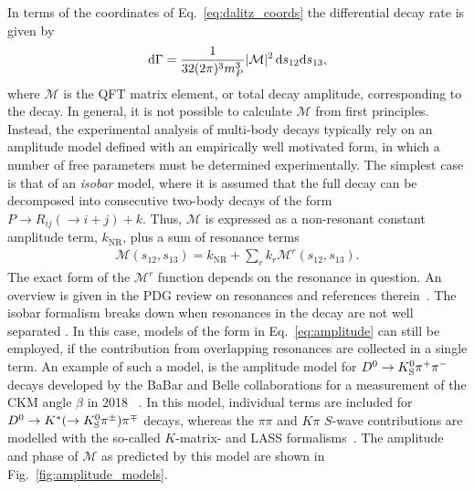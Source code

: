 In terms of the coordinates of Eq.~\eqref{eq:dalitz_coords} the differential decay rate is given by
\begin{align}
    \text d \Gamma = \frac{1}{32(2\pi)^3 m^3_P} |\mathcal M|^2 \,\text d s_{12} \text d s_{13},
\end{align}
where $\mathcal M$ is the QFT matrix element, or total decay amplitude, corresponding to the decay. In general, it is not possible to calculate $\mathcal M$ from first principles. Instead, the experimental analysis of multi-body decays typically rely on an amplitude model defined with an empirically well motivated form, in which a number of free parameters must be determined experimentally. The simplest case is that of an \emph{isobar} model, where it is assumed that the full decay can be decomposed into consecutive two-body decays of the form $P \to R_{ij} (\to i + j) + k$. Thus, $\mathcal M$ is expressed as a non-resonant constant amplitude term, $k_\mathrm{NR}$, plus a sum of resonance terms
\begin{align}\label{eq:amplitude}
    \mathcal M (s_{12}, s_{13}) = k_{\mathrm {NR}} + \sum_r k_r \mathcal M^r(s_{12}, s_{13}).
\end{align}
The exact form of the $\mathcal M^r$ function depends on the resonance in question. An overview is given in the PDG review on resonances and references therein~\cite{PDG2020}. The isobar formalism breaks down when resonances in the decay are not well separated . In this case, models of the form in Eq.~\eqref{eq:amplitude} can still be employed, if the contribution from overlapping resonances are collected in a single term. An example of such a model, is the amplitude model for ${{D}^0}\rightarrow{\ensuremath{{K}^0_{\mathrm{S}}}}{\ensuremath{{\pi}^+}}{\ensuremath{{\pi}^-}}$ decays developed by the BaBar and Belle collaborations for a measurement of the CKM angle $\beta$ in 2018~\cite{Belle2018} . In this model, individual terms are included for ${{D}^0}\rightarrow{\ensuremath{{K}^*}}(\rightarrow{\ensuremath{{K}^0_{\mathrm{S}}}}\pi^\pm){{\pi}^\mp}$ decays, whereas the $\pi\pi$ and $K\pi$  $S$-wave contributions are modelled with the so-called $K$-matrix- and LASS formalisms~\cite{chungPartialWaveAnalysis1995,astonStudyPiScattering1988}. The amplitude and phase of $\mathcal M$ as predicted by this model are shown in Fig.~\ref{fig:amplitude_models}.

